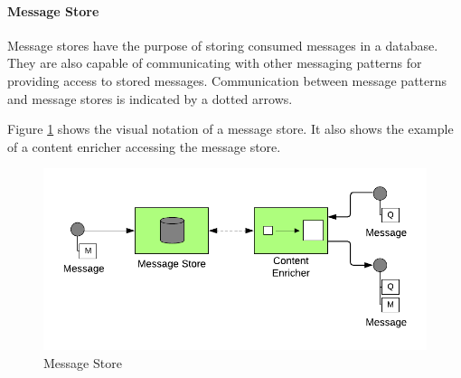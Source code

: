 \paragraph{Message Store}

Message stores have the purpose of storing consumed messages in a database. They are also capable of communicating with other messaging patterns for providing access to stored messages. Communication between message patterns and message stores is indicated by a dotted arrows.

Figure \ref{messaging:store} shows the visual notation of a message store. It also shows the example of a content enricher accessing the message store.

\begin{figure}[H]
    \centering
    \includegraphics[scale=0.6]{Diagrams/Messaging/12. Message Store.pdf}
    \caption{Message Store}
    \label{messaging:store}
\end{figure}

